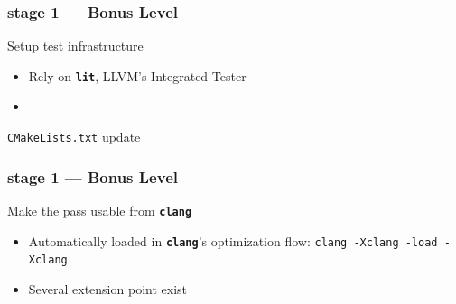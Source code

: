 \documentclass[14pt]{beamer}
\newcommand{\Command}[1]{\textbf{\texttt{#1}}}
\begin{document}
    \begin{frame}[containsverbatim]
        \frametitle{stage 1 --- Bonus Level}
        \begin{alertblock}{Setup test infrastructure}
            \begin{itemize}
                \item Rely on \Command{lit}, LLVM's Integrated Tester
                \item {\footnotesize
\begin{lstlisting}[language=bash]
% pip install --user lit
\end{lstlisting}
                    }
            \end{itemize}
        \end{alertblock}

        \begin{block}{\texttt{CMakeLists.txt} update}
{
\scriptsize

}
        \end{block}
    \end{frame}

    \begin{frame}[containsverbatim]
        \frametitle{stage 1 --- Bonus Level}
        \begin{alertblock}{Make the pass usable from \Command{clang}}
            \begin{itemize}
                \item Automatically loaded in \Command{clang}'s optimization flow: {\footnotesize\lstinline|clang -Xclang -load -Xclang|}
                \item Several extension point exist
            \end{itemize}
        \end{alertblock}

{
\scriptsize

}
    \end{frame}

\end{document}
